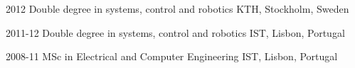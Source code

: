 \documentclass[]{friggeri-cv}
\begin{document}
\begin{entrylist}
	\entry
	{2012}
	{Double degree in systems, control and robotics}
	{KTH, Stockholm, Sweden}
	{}
\end{entrylist}


\begin{entrylist}
	\entry
	{2011-12}
	{Double degree in systems, control and robotics}
	{IST, Lisbon, Portugal}
	{}
\end{entrylist}

\begin{entrylist}
	\entry
	{2008-11}
	{MSc in Electrical and Computer Engineering}
	{IST, Lisbon, Portugal}
	{}

\end{entrylist}
\end{document}
